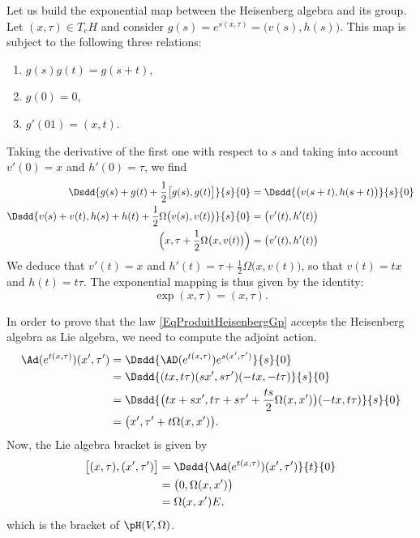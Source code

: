 Let us build the exponential map between the Heisenberg algebra and its group. Let $(x,\tau)\in T_eH$ and consider $g(s)= e^{s(x,\tau)}=\big( v(s),h(s) \big)$.  This map is subject to the following three relations:
\begin{enumerate}

	\item
		$g(s)g(t)=g(s+t)$,
	\item
		$g(0)=0$,
	\item
		$g'(01)=(x,t)$.

\end{enumerate}
Taking the derivative of the first one with respect to $s$ and taking into account $v'(0)=x$ and $h'(0)=\tau$, we find
\begin{subequations}
	\begin{align}
		\Dsdd{g(s)+g(t)+\frac{ 1 }{2}\big[ g(s),g(t) \big]  }{s}{0}&=\Dsdd{ \big( v(s+t),h(s+t) \big) }{s}{0}\\
		\Dsdd{ v(s)+v(t),h(s)+h(t)+\frac{ 1 }{2}\Omega\big( v(s),v(t) \big) }{s}{0}	&=\big( v'(t),h'(t) \big)\\
		\Big( x,\tau+\frac{ 1 }{2}\Omega\big( x,v(t) \big) \Big)&=\big( v'(t),h'(t) \big)
	\end{align}
\end{subequations}
We deduce that $v'(t)=x$ and $h'(t)=\tau+\frac{ 1 }{2}\Omega\big( x,v(t) \big)$, so that $v(t)=tx$ and $h(t)=t\tau$. The exponential mapping is thus given by the identity:
\begin{equation}
	\exp(x,\tau)=(x,\tau).
\end{equation}

In order to prove that the law \eqref{EqProduitHeisenbergGp} accepts the Heisenberg algebra as Lie algebra, we need to compute the adjoint action.
\begin{equation}
	\begin{aligned}[]
		\Ad( e^{t(x,\tau)})(x',\tau')&=\Dsdd{ \AD( e^{t(x,\tau)}) e^{s(x',\tau')} }{s}{0}\\
		&=\Dsdd{ (tx,t\tau)(sx',s\tau')(-tx,-t\tau) }{s}{0}\\
		&=\Dsdd{ \big(tx+sx',t\tau+s\tau'+\frac{ ts }{2}\Omega(x,x')\big)(-tx,t\tau) }{s}{0}\\
		&=\big( x',\tau'+t\Omega(x,x') \big).
	\end{aligned}
\end{equation}
Now, the Lie algebra bracket is given by
\begin{equation}
	\begin{aligned}[]
		\big[ (x,\tau),(x',\tau') \big]&=\Dsdd{ \Ad( e^{t(x,\tau)})(x',\tau') }{t}{0}\\
			&=\big( 0,\Omega(x,x') \big)\\
			&=\Omega(x,x')E,
	\end{aligned}
\end{equation}
which is the bracket of $\pH(V,\Omega)$.

